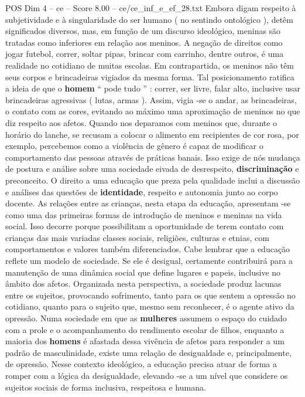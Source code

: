 \begin{textsample}{POS Dim 4 – ce – Score 8.00 – ce/ce\_inf\_e\_ef\_28.txt}
Embora digam respeito à subjetividade e à singularidade do ser humano ( no sentindo ontológico ), detêm significados diversos, mas, em função de um discurso ideológico, meninas são tratadas como inferiores em relação aos meninos.
A negação de direitos como jogar futebol, correr, soltar pipas, brincar com carrinho, dentre outros, é uma realidade no cotidiano de muitas escolas.
Em contrapartida, os meninos não têm seus corpos e brincadeiras vigiados da mesma forma.
Tal posicionamento ratifica a ideia de que o \textbf{homem} “ pode tudo ” : correr, ser livre, falar alto, inclusive usar brincadeiras agressivas ( lutas, armas ).
Assim, vigia -se o andar, as brincadeiras, o contato com as cores, evitando ao máximo uma aproximação de meninos no que diz respeito aos afetos.
Quando nos deparamos com meninos que, durante o horário do lanche, se recusam a colocar o alimento em recipientes de cor rosa, por exemplo, percebemos como a violência de gênero é capaz de modificar o comportamento das pessoas através de práticas banais.
Isso exige de nós mudança de postura e análise sobre uma sociedade eivada de desrespeito, \textbf{discriminação} e preconceito.
O direito a uma educação que preza pela qualidade inclui a discussão e análises das questões de \textbf{identidade}, respeito e autonomia junto ao corpo docente.
As relações entre as crianças, nesta etapa da educação, apresentam -se como uma das primeiras formas de introdução de meninos e meninas na vida social.
Isso decorre porque possibilitam a oportunidade de terem contato com crianças das mais variadas classes sociais, religiões, culturas e etnias, com comportamentos e valores também diferenciados.
Cabe lembrar que a educação reflete um modelo de sociedade.
Se ele é desigual, certamente contribuirá para a manutenção de uma dinâmica social que define lugares e papeis, inclusive no âmbito dos afetos.
Organizada nesta perspectiva, a sociedade produz lacunas entre os sujeitos, provocando sofrimento, tanto para os que sentem a opressão no cotidiano, quanto para o sujeito que, mesmo sem reconhecer, é o agente ativo da opressão.
Numa sociedade em que as \textbf{mulheres} assumem o espaço do cuidado com a prole e o acompanhamento do rendimento escolar de filhos, enquanto a maioria dos \textbf{homens} é afastada dessa vivência de afetos para responder a um padrão de masculinidade, existe uma relação de desigualdade e, principalmente, de opressão.
Nesse contexto ideológico, a educação precisa atuar de forma a romper com a lógica da desigualdade, elevando -se a um nível que considere os sujeitos sociais de forma inclusiva, respeitosa e humana.

\end{textsample}
